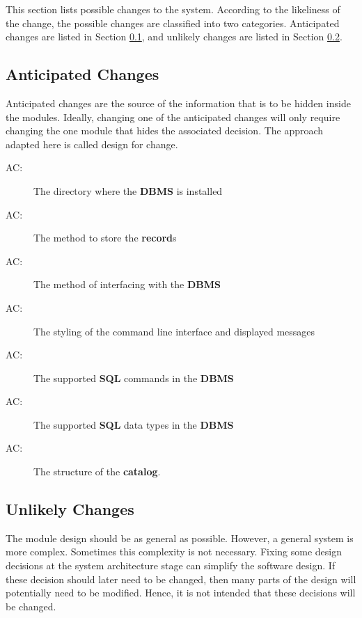 \documentclass[12pt, titlepage]{article}
\newcounter{acnum}
\newcommand{\actheacnum}{AC\theacnum}
\begin{document}
This section lists possible changes to the system. According to the likeliness
of the change, the possible changes are classified into two
categories. Anticipated changes are listed in Section \ref{SecAchange}, and
unlikely changes are listed in Section \ref{SecUchange}.

\subsection{Anticipated Changes} \label{SecAchange}

Anticipated changes are the source of the information that is to be hidden
inside the modules. Ideally, changing one of the anticipated changes will only
require changing the one module that hides the associated decision. The approach
adapted here is called design for
change.

\begin{description}
\item[ \actheacnum \label{ac1}:] The directory where the \textbf{DBMS} is installed
\item[ \actheacnum \label{ac2}:] The method to store the \textbf{record}s
\item[ \actheacnum \label{ac3}:] The method of interfacing with the \textbf{DBMS}
\item[ \actheacnum \label{ac4}:] The styling of the command line interface and displayed messages
\item[ \actheacnum \label{ac5}:] The supported \textbf{SQL} commands in the \textbf{DBMS}
\item[ \actheacnum \label{ac6}:] The supported \textbf{SQL} data types in the \textbf{DBMS}
\item[ \actheacnum \label{ac7}:] The structure of the \textbf{catalog}.
\end{description}

\subsection{Unlikely Changes} \label{SecUchange}

The module design should be as general as possible. However, a general system is
more complex. Sometimes this complexity is not necessary. Fixing some design
decisions at the system architecture stage can simplify the software design. If
these decision should later need to be changed, then many parts of the design
will potentially need to be modified. Hence, it is not intended that these
decisions will be changed.
\end{document}
